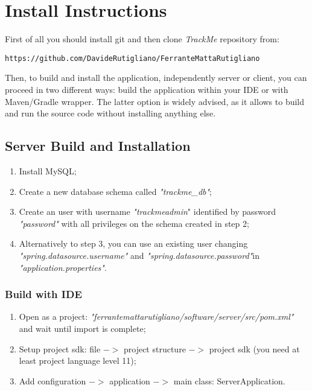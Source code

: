 \documentclass[a4paper]{article}
\begin{document}
\newpage
\section{Install Instructions}

First of all you should install git and then clone \textit{TrackMe} repository from:
\begin{lstlisting}
https://github.com/DavideRutigliano/FerranteMattaRutigliano
\end{lstlisting}

Then, to build and install the application, independently server or client, you can proceed in two different ways: build the application within your IDE or with Maven/Gradle wrapper. The latter option is widely advised, as it allows to build and run the source code without installing anything else.

\subsection{Server Build and Installation}
\begin{enumerate}
    \item Install MySQL;
    \item Create a new database schema called \textit{"trackme\_db"};
    \item Create an user with username \textit{"trackmeadmin}" identified by password \textit{"password"} with all privileges on the schema created in step 2; \item Alternatively to step 3, you can use an existing user changing
    \newline\textit{"spring.datasource.username"} and \textit{"spring.datasource.password"}\newline in \textit{"application.properties"}. 
\end{enumerate}

\subsubsection{Build with IDE}
\begin{enumerate}
    \item Open as a project: \textit{"ferrantemattarutigliano/software/server/src/pom.xml"} and wait until import is complete;
    \item Setup project sdk: file ${->}$ project structure ${->}$ project sdk (you need at least project language level 11);
    \item Add configuration ${->}$ application ${->}$ main class: ServerApplication.
\end{enumerate}
\end{document}
